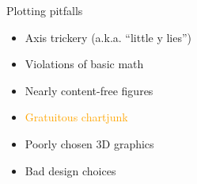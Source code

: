 \documentclass[
  ignorenonframetext,
]{beamer}
\providecommand{\tightlist}{%
  \setlength{\itemsep}{0pt}\setlength{\parskip}{0pt}}
\begin{document}
\begin{frame}{}
\label{section-14}
\end{frame}

\begin{frame}{}
\label{section-15}
\end{frame}

\begin{frame}{Plotting pitfalls}
\label{plotting-pitfalls-3}
\begin{itemize}
\tightlist
\item
  Axis trickery (a.k.a. ``little y lies'')
\item
  Violations of basic math
\item
  Nearly content-free figures
\item
  \textcolor{orange}{Gratuitous chartjunk}
\item
  Poorly chosen 3D graphics
\item
  Bad design choices
\end{itemize}
\end{frame}
\end{document}
